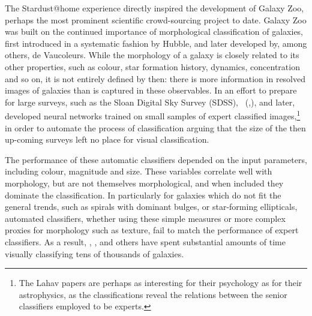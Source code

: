 \documentclass{ar2e}
\begin{document}



The Stardust@home experience directly inspired the development of Galaxy Zoo,
perhaps the most prominent scientific crowd-sourcing project to date. Galaxy Zoo
was built on the continued importance of morphological classification of
galaxies, first introduced in a systematic fashion by Hubble, and later
developed by, among others, de Vaucoleurs.  While the morphology of a galaxy is
closely related to its other properties, such as colour, star formation history,
dynamics, concentration and so on, it is not entirely defined by then: there is
more information in resolved images of galaxies than is captured in these
observables.  In an effort to prepare for large surveys, such as the Sloan
Digital Sky Survey (SDSS),
\citeauthor{Lahav1995}~(\citeyear{Lahav1995},\citeyear{Lahav1996}), and later,
\citet{Ball} developed neural networks trained on small samples of expert
classified images,\footnote{The Lahav papers are perhaps as interesting for
their psychology as for their astrophysics, as the classifications reveal the
relations between the senior classifiers employed to be experts.} in order to
automate the process of classification arguing that the size of the then
up-coming surveys left no place for visual classification.

The performance of these automatic classifiers depended on the input parameters,
including colour, magnitude and size. These variables correlate well with
morphology, but are not themselves morphological, and when included they
dominate the classification. In particularly for galaxies which do not fit the
general trends, such as spirals with dominant bulges, or star-forming
ellipticals, automated classifiers, whether using these simple measures or
more complex proxies for morphology such as texture, fail to match the
performance of expert classifiers. As a result, \citet{Scha2007},
\citet{Nair}, and others have spent substantial amounts of time visually
classifying tens of thousands of galaxies. 
\end{document}
